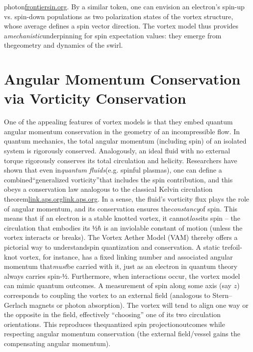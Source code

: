 photon\href{https://www.frontiersin.org/journals/physics/articles/10.3389/fphy.2023.1225334/full#:~:text=description%20of%20polarisation%20states%20by,parameters%20are%20order%20parameters%20to}{frontiersin.org}. By a similar token, one can envision an electron’s spin-up vs. spin-down populations as two polarization states of the vortex structure, whose average defines a spin vector direction. The vortex model thus provides a\textit{mechanistic}underpinning for spin expectation values: they emerge from thegeometry and dynamics of the swirl.

\section*{Angular Momentum Conservation via Vorticity Conservation}
One of the appealing features of vortex models is that they embed quantum angular momentum conservation in the geometry of an incompressible flow. In quantum mechanics, the total angular momentum (including spin) of an isolated system is rigorously conserved. Analogously, an ideal fluid with no external torque rigorously conserves its total circulation and helicity. Researchers have shown that even in\textit{quantum fluids}(e.g. spinful plasmas), one can define a combined“generalized vorticity”that includes the spin contribution, and this obeys a conservation law analogous to the classical Kelvin circulation theorem\href{https://link.aps.org/accepted/10.1103/PhysRevLett.107.195003#:~:text=It%20is%20shown%20that%20a,a%20well%20known%20and%20highly}{link.aps.org}\href{https://link.aps.org/accepted/10.1103/PhysRevLett.107.195003#:~:text=In%20this%20paper%20we%20demonstrate,macroscopic%20spin%20vector%20field%20S}{link.aps.org}. In a sense, the fluid’s vorticity flux plays the role of angular momentum, and its conservation ensures the\textit{constancy}of spin. This means that if an electron is a stable knotted vortex, it cannot\textit{lose}its spin – the circulation that embodies its $½\hbar$ is an inviolable constant of motion (unless the vortex interacts or breaks). The Vortex Aether Model (VAM) thereby offers a pictorial way to understandspin quantization and conservation. A static trefoil-knot vortex, for instance, has a fixed linking number and associated angular momentum that\textit{must}be carried with it, just as an electron in quantum theory always carries spin-$½$. Furthermore, when interactions occur, the vortex model can mimic quantum outcomes. A measurement of spin along some axis (say $z$) corresponds to coupling the vortex to an external field (analogous to Stern–Gerlach magnets or photon absorption). The vortex will tend to align one way or the opposite in the field, effectively “choosing” one of its two circulation orientations. This reproduces thequantized spin projectionoutcomes while respecting angular momentum conservation (the external field/vessel gains the compensating angular momentum).

